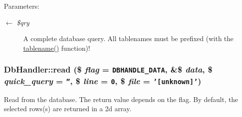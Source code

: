 \begin{Desc}
\item[Parameters:]
\begin{description}
\item[\mbox{$\leftarrow$} {\em \$qry}]A complete database query. All tablenames must be prefixed (with the \hyperlink{classDbHandler_baca15a312800e5522b3efd9dff036f5}{tablename()} function)! \end{description}
\end{Desc}
\hypertarget{classDbHandler_5ebfdc2acfcb0e9cbc2861fc55c7127c}{
\subsubsection{\setlength{\rightskip}{0pt plus 5cm}DbHandler::read (\$ {\em flag} = {\tt {\bf DBHANDLE\_\-DATA}}, \&\$ {\em data}, \$ {\em quick\_\-query} = {\tt ''}, \$ {\em line} = {\tt 0}, \$ {\em file} = {\tt '\mbox{[}unknown\mbox{]}'})}}
\label{classDbHandler_5ebfdc2acfcb0e9cbc2861fc55c7127c}


Read from the database. The return value depends on the flag. By default, the selected rows(s) are returned in a 2d array.

